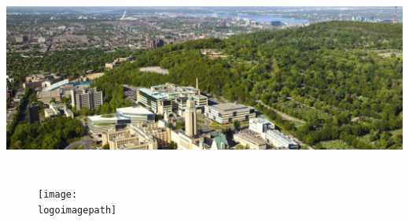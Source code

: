 {

    \begin{specialframe}
        \begin{center}
            \includegraphics[width=1.058\textwidth]{./logos/poly_sky.png}
        \end{center}

        \vspace{-0.5cm}

        \begin{block}{}
            \begin{columns}
                    \begin{minipage}[t][.2\textheight][c]{\linewidth}
                    \begin{figure}
                        \flushleft
                        \texttt{[image: \\logoimagepath]}
                    \end{figure}
                    \end{minipage}    
                    \begin{minipage}[c][.2\textheight][c]{\linewidth}
                        \centering
                        {\Large \textcolor{polyred}{\textbf{\scshape{\slidesettitle}}}}
                    \end{minipage}
                \end{columns}

                \vspace{-0.3cm}


\end{block}
\end{specialframe}}
